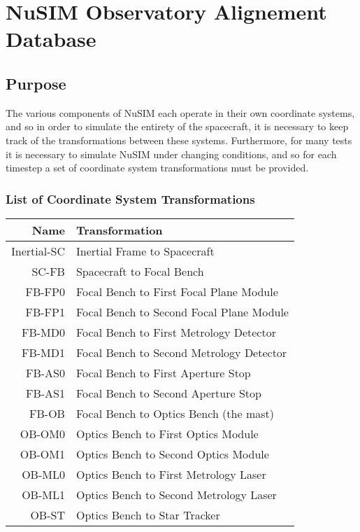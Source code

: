 

%



\chapter{NuSIM Observatory Alignement Database}
\section{Purpose}
The various components of NuSIM each operate in their own coordinate systems, and so in order to simulate the entirety of the spacecraft, it is necessary to keep track of the transformations between these systems. Furthermore, for many tests it is necessary to simulate NuSIM under changing conditions, and so for each timestep a set of coordinate system transformations must be provided. 

\subsection{List of Coordinate System Transformations}


\begin{tabular}{| r | l |}
\hline
{\bf Name}	&	{\bf Transformation}						\\
\hline
Inertial-SC	&	Inertial Frame to Spacecraft				\\
SC-FB		&	Spacecraft to Focal Bench				\\
FB-FP0		&	Focal Bench to First Focal Plane Module		\\
FB-FP1		&	Focal Bench to Second Focal Plane Module	\\
FB-MD0		&	Focal Bench to First Metrology Detector		\\
FB-MD1		&	Focal Bench to Second Metrology Detector	\\
FB-AS0		&	Focal Bench to First Aperture Stop			\\
FB-AS1		&	Focal Bench to Second Aperture Stop		\\
FB-OB		&	Focal Bench to Optics Bench (the mast)		\\
OB-OM0		&	Optics Bench to First Optics Module			\\
OB-OM1		&	Optics Bench to Second Optics Module		\\
OB-ML0		&	Optics Bench to First Metrology Laser		\\
OB-ML1		&	Optics Bench to Second Metrology Laser		\\
OB-ST		&	Optics Bench to Star Tracker				\\
\hline
\end{tabular}


